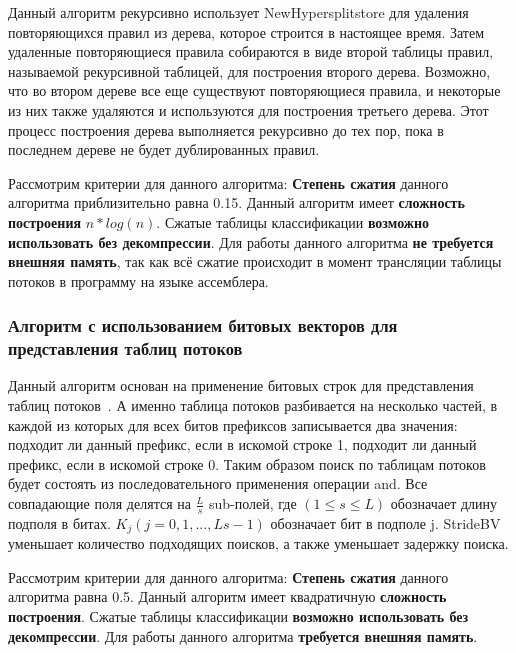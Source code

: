 \documentclass[oneside,final,12pt]{extarticle}
\begin{document}
            Данный алгоритм рекурсивно использует NewHypersplitstore для удаления повторяющихся правил из дерева, которое строится в настоящее время. 
            Затем удаленные повторяющиеся правила собираются в виде второй таблицы правил, называемой рекурсивной таблицей, для построения второго дерева. 
            Возможно, что во втором дереве  все еще существуют повторяющиеся правила, и некоторые из них также удаляются и используются для построения третьего дерева. 
            Этот процесс построения дерева выполняется рекурсивно до тех пор, пока в последнем дереве не будет дублированных правил. 

            Рассмотрим критерии для данного алгоритма: \textbf{Степень сжатия} данного алгоритма приблизительно равна 0.15.
            Данный алгоритм имеет \textbf{сложность построения} \(n*log(n)\). Сжатые таблицы классификации \textbf{возможно использовать без декомпрессии}.
            Для работы данного алгоритма \textbf{не требуется внешняя память}, так как всё сжатие происходит в момент трансляции таблицы потоков в
            программу на языке ассемблера.
        \subsubsection{Алгоритм с использованием битовых векторов для представления таблиц потоков}
            Данный алгоритм основан на применение битовых строк для представления таблиц потоков~\cite{shi2020msbv}. А именно таблица потоков разбивается на несколько частей,
            в каждой из которых для всех битов префиксов записывается два значения: подходит ли данный префикс, если в искомой строке 1, 
            подходит ли данный префикс, если в искомой строке 0. Таким образом поиск по таблицам потоков будет состоять из последовательного применения 
            операции and.
            Все совпадающие поля делятся на \(\frac{L}{s}\) sub-полей, где \((1 ≤ s ≤ L)\) обозначает длину подполя в битах. 
            \(K_j (j = 0,1, ..., Ls − 1)\) обозначает бит в подполе j. StrideBV уменьшает количество подходящих поисков, 
            а также уменьшает задержку поиска.             

            Рассмотрим критерии для данного алгоритма: \textbf{Степень сжатия} данного алгоритма равна 0.5.
            Данный алгоритм имеет квадратичную \textbf{сложность построения}. Сжатые таблицы классификации \textbf{возможно использовать без декомпрессии}.
            Для работы данного алгоритма \textbf{требуется внешняя память}.
\end{document}
